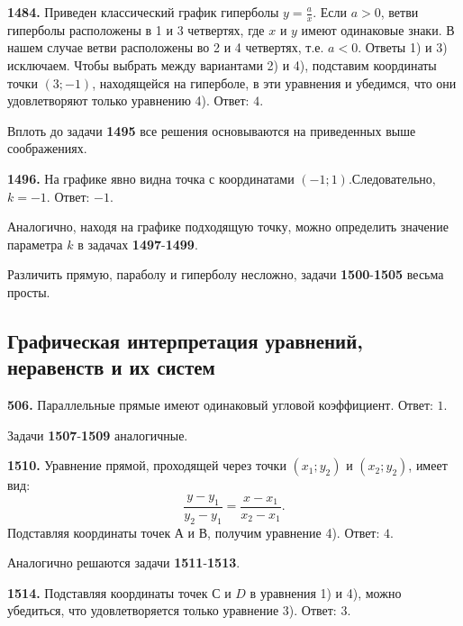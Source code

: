 \textbf{1484.} Приведен классический график гиперболы $y=\frac{a}{x}$. Если $a>0$, ветви гиперболы расположены в 1 и 3 четвертях, где $x$ и $y$ имеют одинаковые знаки. В нашем случае ветви расположены во 2 и 4 четвертях, т.е. $a<0$. Ответы 1) и 3) исключаем. Чтобы выбрать между вариантами 2) и 4), подставим координаты точки $(3;-1)$, находящейся на гиперболе,  в эти уравнения и убедимся, что они удовлетворяют только уравнению 4). \newline \null \hspace*{\fill} Ответ: $4$.

Вплоть до задачи \textbf{1495} все решения основываются на приведенных выше соображениях.

\textbf{1496.} На графике явно видна точка с координатами $(-1;1)$.\newline Следовательно, $k=-1$. \newline \null \hspace*{\fill} Ответ: $-1$. 

Аналогично, находя на графике подходящую точку, можно определить значение параметра $k$ в задачах \textbf{1497}-\textbf{1499}.

Различить прямую, параболу и гиперболу несложно, задачи \textbf{1500}-\textbf{1505} весьма просты.

\subsection{Графическая интерпретация уравнений, неравенств и их систем}


\textbf{506.}  Параллельные прямые имеют одинаковый угловой коэффициент. \newline \null \hspace*{\fill} Ответ: $1$. 

Задачи  \textbf{1507}-\textbf{1509} аналогичные.

\newpage \textbf{1510.} Уравнение прямой, проходящей через точки $(x_1;y_2)$ и \newline $(x_2;y_2)$, имеет вид: $$\frac{y-y_1}{y_2-y_1}=\frac{x-x_1}{x_2-x_1}.$$
Подставляя координаты точек  А и В, получим уравнение 4). \newline \null \hspace*{\fill} Ответ: $4$. 

Аналогично решаются задачи \textbf{1511}-\textbf{1513}.

\textbf{1514.} Подставляя координаты точек $С$ и $D$ в уравнения 1) и 4), можно убедиться, что  удовлетворяется только уравнение 3). \newline \null \hspace*{\fill} Ответ: $3$.

